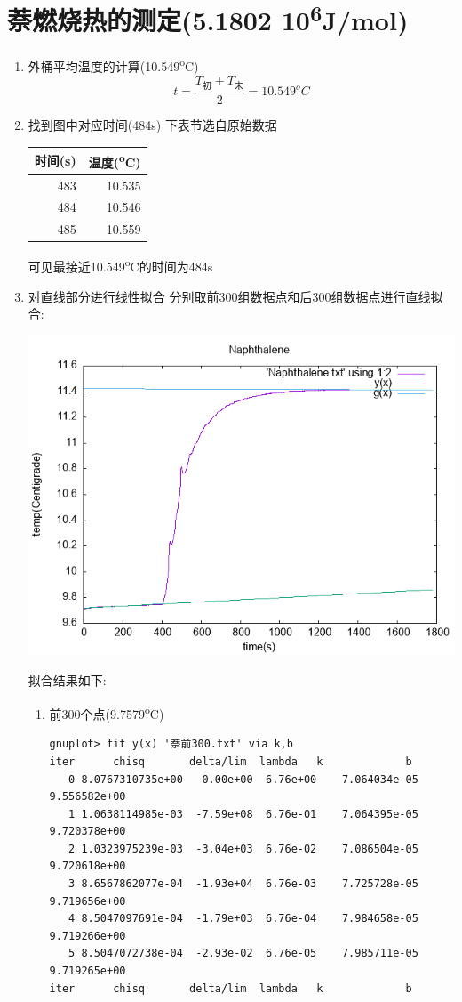 \documentclass[11pt]{report}
\begin{document}
\section{萘燃烧热的测定(5.1802\texttimes{} 10\textsuperscript{6}J/mol)}
\label{sec:orge155317}
\begin{enumerate}
\item 外桶平均温度的计算(10.549\textsuperscript{o}C)
\label{sec:org2899003}
\[
     t=\frac{T_{初}+T_{末}}{2}=10.549^{o}C
     \]
\item 找到图中对应时间(484s)
\label{sec:org15d4db5}
下表节选自原始数据
\begin{center}
\begin{tabular}{rr}
时间(s) & 温度(\textsuperscript{o}C)\\
\hline
483 & 10.535\\
484 & 10.546\\
485 & 10.559\\
\end{tabular}
\end{center}

可见最接近10.549\textsuperscript{o}C的时间为484s

\item 对直线部分进行线性拟合
\label{sec:orgc274064}
分别取前300组数据点和后300组数据点进行直线拟合:
\begin{center}
\includegraphics[width=.9\linewidth]{../img/Naphthalene.png}
\end{center}
拟合结果如下:
\begin{enumerate}
\item 前300个点(9.7579\textsuperscript{o}C)
\label{sec:org47499fb}
\begin{verbatim}
gnuplot> fit y(x) '萘前300.txt' via k,b      
iter      chisq       delta/lim  lambda   k             b            
   0 8.0767310735e+00   0.00e+00  6.76e+00    7.064034e-05   9.556582e+00
   1 1.0638114985e-03  -7.59e+08  6.76e-01    7.064395e-05   9.720378e+00
   2 1.0323975239e-03  -3.04e+03  6.76e-02    7.086504e-05   9.720618e+00
   3 8.6567862077e-04  -1.93e+04  6.76e-03    7.725728e-05   9.719656e+00
   4 8.5047097691e-04  -1.79e+03  6.76e-04    7.984658e-05   9.719266e+00
   5 8.5047072738e-04  -2.93e-02  6.76e-05    7.985711e-05   9.719265e+00
iter      chisq       delta/lim  lambda   k             b            


\end{verbatim}
\end{enumerate}
\end{enumerate}
\end{document}
